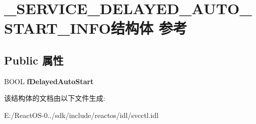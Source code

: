 \hypertarget{struct___s_e_r_v_i_c_e___d_e_l_a_y_e_d___a_u_t_o___s_t_a_r_t___i_n_f_o}{}\section{\+\_\+\+S\+E\+R\+V\+I\+C\+E\+\_\+\+D\+E\+L\+A\+Y\+E\+D\+\_\+\+A\+U\+T\+O\+\_\+\+S\+T\+A\+R\+T\+\_\+\+I\+N\+F\+O结构体 参考}
\label{struct___s_e_r_v_i_c_e___d_e_l_a_y_e_d___a_u_t_o___s_t_a_r_t___i_n_f_o}
\subsection*{Public 属性}
\begin{DoxyCompactItemize}
\item 
\mbox{\label{struct___s_e_r_v_i_c_e___d_e_l_a_y_e_d___a_u_t_o___s_t_a_r_t___i_n_f_o_a5537a91b5281ed493f64147ef93c42ed}} 
B\+O\+OL {\bfseries f\+Delayed\+Auto\+Start}
\end{DoxyCompactItemize}


该结构体的文档由以下文件生成\+:\begin{DoxyCompactItemize}
\item 
E\+:/\+React\+O\+S-\/0../sdk/include/reactos/idl/svcctl.\+idl\end{DoxyCompactItemize}
